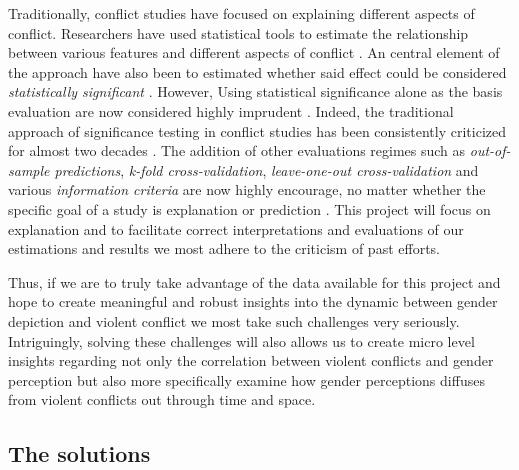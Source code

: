 \documentclass[a4paper]{article}
\begin{document}
Traditionally, conflict studies have focused on explaining different aspects of conflict. Researchers have used statistical tools to estimate the relationship between various features and different aspects of conflict \citep[8]{chadefaux2017conflict}. An central element of the approach have also been to estimated whether said effect could be considered \emph{statistically significant} \citep[363-364]{Ward_Greenhill_Bakke_2010}. However, Using statistical significance alone as the basis evaluation are now considered highly imprudent \citep{Ward_Greenhill_Bakke_2010, Schrodt_2014, chadefaux2017conflict}. Indeed, the traditional approach of significance testing in conflict studies has been consistently criticized for almost two decades \citep{king_zeng_2001b, Ward_Greenhill_Bakke_2010, Goldstone_2010, Schrodt_2014, chadefaux2017conflict}. The addition of other evaluations regimes such as \emph{out-of-sample predictions}, \emph{k-fold cross-validation}, \emph{leave-one-out cross-validation} and various \emph{information criteria} are now highly encourage, no matter whether the specific goal of a study is explanation or prediction \citep{Ward_Greenhill_Bakke_2010, Schrodt_2014, Mcelreath_2018}. This project will focus on explanation and to facilitate correct interpretations and evaluations of our estimations and results we most adhere to the criticism of past efforts.\par 

Thus, if we are to truly take advantage of the data available for this project and hope to create meaningful and robust insights into the dynamic between gender depiction and violent conflict we most take such challenges very seriously. Intriguingly, solving these challenges will also allows us to create micro level insights regarding not only the correlation between violent conflicts and gender perception but also more specifically examine how gender perceptions diffuses from violent conflicts out through time and space.\par


\subsection{The solutions}
\end{document}
